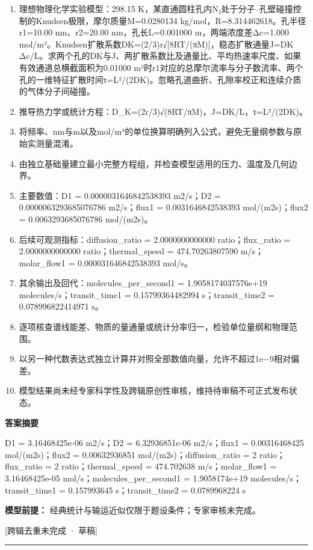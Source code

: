 \documentclass[UTF8,11pt,a4paper]{ctexart}
\begin{document}
\begin{enumerate}
\item 理想物理化学实验模型：298.15 K，某直通圆柱孔内N₂处于分子–孔壁碰撞控制的Knudsen极限，摩尔质量M=0.0280134 kg/mol，R=8.314462618。孔半径r1=10.00 nm、r2=20.00 nm，孔长L=0.001000 m，两端浓度差Δc=1.000 mol/m³。Knudsen扩散系数DK=(2/3)r√[8RT/(πM)]，稳态扩散通量J=DK Δc/L。求两个孔的DK与J、两扩散系数比及通量比、平均热速率尺度、如果有效通道总横截面积为0.01000 m²时r1对应的总摩尔流率与分子数流率、两个孔的一维特征扩散时间τ=L²/(2DK)。忽略孔道曲折、孔隙率校正和连续介质的气体分子间碰撞。
\item 推导热力学或统计方程：D\_K=(2r/3)√(8RT/πM)，J=DK/L，τ=L²/(2DK)。
\item 将频率、nm与m以及mol/m³的单位换算明确列入公式，避免无量纲参数与原始实测量混淆。
\item 由独立基础量建立最小完整方程组，并检查模型适用的压力、温度及几何边界。
\item 主要数值：D1 = 0.0000031646842538393 m2/s；D2 = 0.0000063293685076786 m2/s；flux1 = 0.0031646842538393 mol/(m2s)；flux2 = 0.0063293685076786 mol/(m2s)。
\item 后续可观测指标：diffusion\_ratio = 2.0000000000000 ratio；flux\_ratio = 2.0000000000000 ratio；thermal\_speed = 474.70263807590 m/s；molar\_flow1 = 0.000031646842538393 mol/s。
\item 其余输出及回代：molecules\_per\_second1 = 1.9058174037576e+19 molecules/s；transit\_time1 = 0.15799364482994 s；transit\_time2 = 0.078996822414971 s。
\item 逐项核查谱线能差、物质的量通量或统计分率归一，检验单位量纲和物理范围。
\item 以另一种代数表达式独立计算并对照全部数值向量，允许不超过1e−9相对偏差。
\item 模型结果尚未经专家科学性及跨辑原创性审核，维持待审稿不可正式发布状态。
\end{enumerate}
\noindent\textbf{答案摘要}\par
D1 = 3.16468425e-06 m2/s；D2 = 6.32936851e-06 m2/s；flux1 = 0.00316468425 mol/(m2s)；flux2 = 0.00632936851 mol/(m2s)；diffusion\_ratio = 2 ratio；flux\_ratio = 2 ratio；thermal\_speed = 474.702638 m/s；molar\_flow1 = 3.16468425e-05 mol/s；molecules\_per\_second1 = 1.9058174e+19 molecules/s；transit\_time1 = 0.157993645 s；transit\_time2 = 0.0789968224 s\par
\noindent\textbf{模型前提：}
经典统计与输运近似仅限于题设条件；专家审核未完成。\par
\noindent\textcolor{red!65!black}{[跨辑去重未完成 · 草稿]} \par
\medskip\hrule\medskip
{}
\end{document}
